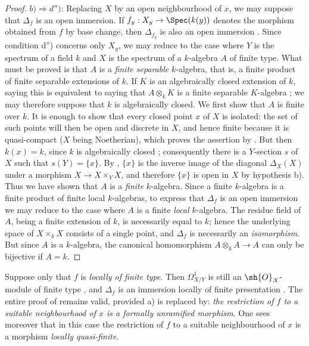 \begin{proof}
$b)\Rightarrow d'')$: Replacing $X$ by an open neighbourhood of $x$, we may suppose that $\Delta_f$ is an open immersion. If $f_y:X_y\to\Spec(k(y))$ denotes the morphism obtained from $f$ by base change, then $\Delta_{f_y}$ is also an open immersion . Since condition d'') concerns only $X_y$, we may reduce to the case where $Y$ is the spectrum of a field $k$ and $X$ is the spectrum of a $k$-algebra $A$ of finite type. What must be proved is that $A$ is a \emph{finite separable} $k$-algebra, that is, a finite product of finite separable extensions of $k$.
If $K$ is an algebraically closed extension of $k$, saying this is equivalent to saying that $A\otimes_k K$ is a finite separable $K$-algebra ; we may therefore suppose that $k$ is algebraically closed. We first show that $A$ is finite over $k$. It is enough to show that every closed point $x$ of $X$ is isolated: the set of such points will then be open and discrete in $X$, and hence finite because it is quasi-compact ($X$ being Noetherian), which proves the assertion by . But then $k(x)=k$, since $k$ is algebraically closed ; consequently there is a $Y$-section $s$ of $X$ such that $s(Y)=\{x\}$. By , $\{x\}$ is the inverse image of the diagonal $\Delta_X(X)$ under a morphism $X\to X\times_Y X$, and therefore $\{x\}$ is open in $X$ by hypothesis b). Thus we have shown that $A$ is a
\emph{finite} $k$-algebra.
Since a finite $k$-algebra is a finite product of finite local $k$-algebras, to express that $\Delta_f$ is an open immersion we may reduce to the case where $A$ is a finite \emph{local} $k$-algebra. The residue field of $A$, being a finite extension of $k$, is necessarily equal to $k$; hence  the underlying space of $X\times_k X$ consists of a single point, and $\Delta_f$ is necessarily an \emph{isomorphism}.
But since $A$ is a $k$-algebra, the canonical homomorphism $A\otimes_k A\to A$ can only be bijective if $A=k$.
\end{proof}

\begin{remark}[17.4.1.2]
\label{IV.17.4.1.2}
Suppose only that $f$ is \emph{locally of finite type}.
Then $\Omega^1_{X/Y}$ is still an $\sh{O}_X$-module of finite type , and $\Delta_f$ is an immersion locally of finite presentation .
The entire proof of  remains valid, provided a) is replaced by: \emph{the restriction of $f$ to a suitable neighbourhood of $x$ is a formally unramified morphism}.
One sees moreover that in this case the restriction of $f$ to a suitable neighbourhood of $x$ is a morphism \emph{locally quasi-finite}.
\end{remark}

